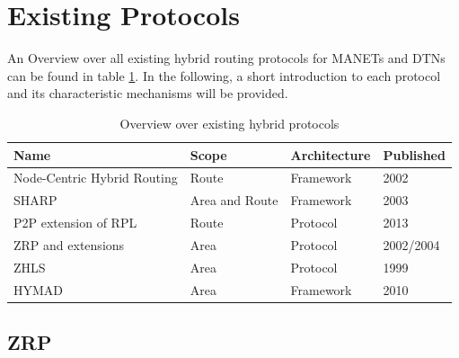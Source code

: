 \documentclass[a4paper,10pt]{scrartcl}
\begin{document}

\section{Existing Protocols}
\label{sec:existing_protocols}
An Overview over all existing hybrid routing protocols for \glspl{MANET} and \glspl{DTN}
can be found in table \ref{fig:overview}. In the following, a short introduction to each protocol and its characteristic mechanisms will be provided.

\begin{table}[t]
    \begin{tabular}{p{}|l|l|l}
        Name & Scope & Architecture & Published \\
        \hline
        Node-Centric Hybrid Routing \cite{Roy_nodecentric} & Route & Framework & 2002 \\ %
        \gls{SHARP}\cite{SHARP} & Area and Route & Framework & 2003 \\ %
        P2P extension\cite{RFC-6997} of RPL\cite{RFC-6550} & Route & Protocol & 2013\\
        \gls{ZRP} \cite{ZRP-Draft} and extensions \cite{TZRP} \cite{IZR} \cite{WARP} & Area & Protocol & 2002/2004\\
        \gls{ZHLS}\cite{ZHLS} & Area & Protocol & 1999\\
        \gls{HYMAD}\cite{HYMAD} & Area & Framework & 2010\\ %
    \end{tabular}
    \caption{Overview over existing hybrid protocols}
    \label{fig:overview}
\end{table}

\newpage %

\subsection{\gls{ZRP}}
\label{subsec:zrp}
\end{document}
